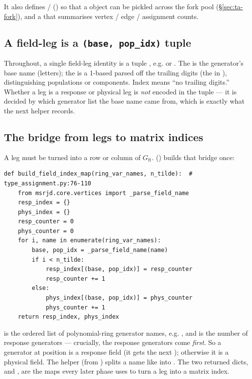 It also defines /
() so that a  object can be
pickled across the fork pool (\S\ref{sec:ta-fork}), and a 
that summarises vertex / edge / assignment counts.

\subsection{A field-leg is a \texttt{(base, pop\_idx)} tuple}

Throughout, a single field-leg identity is a tuple , e.g.  or . The  is
the generator's base name (letters); the  is a 1-based
 parsed off the trailing digits (the  in
), distinguishing populations or components. Index  means ``no
trailing digits.'' Whether a leg is a response or physical leg is \emph{not}
encoded in the tuple --- it is decided by which generator list the base name came
from, which is exactly what the next helper records.

\subsection{The bridge from legs to matrix indices}

A leg  must be turned into a row or column of
$G_{\mathrm{ft}}$. 
() builds that bridge once:

\begin{lstlisting}
def build_field_index_map(ring_var_names, n_tilde):  # type_assignment.py:76-110
    from msrjd.core.vertices import _parse_field_name
    resp_index = {}
    phys_index = {}
    resp_counter = 0
    phys_counter = 0
    for i, name in enumerate(ring_var_names):
        base, pop_idx = _parse_field_name(name)
        if i < n_tilde:
            resp_index[(base, pop_idx)] = resp_counter
            resp_counter += 1
        else:
            phys_index[(base, pop_idx)] = phys_counter
            phys_counter += 1
    return resp_index, phys_index
\end{lstlisting}

 is the ordered list of polynomial-ring generator names,
e.g. \code{['vt1','vt2','nt1','nt2','dv1','dv2','dn1','dn2']}, and 
is the number of response generators --- crucially, the response generators come
\emph{first}. So a generator at position  is a response field
(it gets the next ); otherwise it is a physical field. The
helper  (from ) splits a
name like  into . The two returned dicts,
 and , are the maps every later phase uses to
turn a leg into a matrix index.

